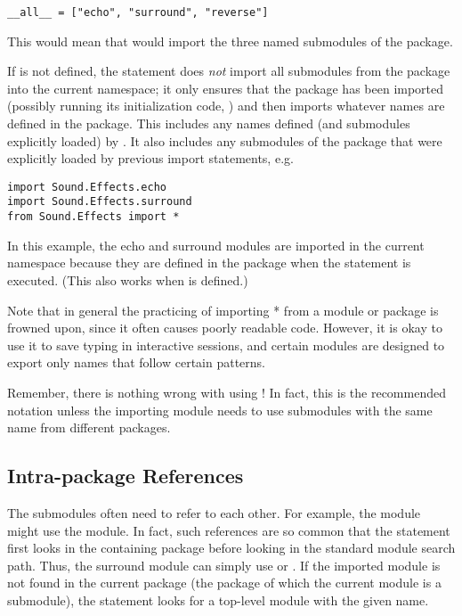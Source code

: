 \documentclass{manual}
\begin{document}
\begin{verbatim}
__all__ = ["echo", "surround", "reverse"]
\end{verbatim}

This would mean that  would
import the three named submodules of the  package.

If  is not defined, the statement  does \emph{not} import all submodules from the package
 into the current namespace; it only ensures that the
package  has been imported (possibly running its
initialization code, ) and then imports whatever names are
defined in the package.  This includes any names defined (and
submodules explicitly loaded) by .  It also includes any
submodules of the package that were explicitly loaded by previous
import statements, e.g.

\begin{verbatim}
import Sound.Effects.echo
import Sound.Effects.surround
from Sound.Effects import *
\end{verbatim}


In this example, the echo and surround modules are imported in the
current namespace because they are defined in the
 package when the  statement
is executed.  (This also works when  is defined.)

Note that in general the practicing of importing * from a module or
package is frowned upon, since it often causes poorly readable code.
However, it is okay to use it to save typing in interactive sessions,
and certain modules are designed to export only names that follow
certain patterns.

Remember, there is nothing wrong with using !  In fact, this is the
recommended notation unless the importing module needs to use
submodules with the same name from different packages.


\subsection{Intra-package References}

The submodules often need to refer to each other.  For example, the
 module might use the  module.  In fact, such references
are so common that the  statement first looks in the
containing package before looking in the standard module search path.
Thus, the surround module can simply use  or
.  If the imported module is not
found in the current package (the package of which the current module
is a submodule), the  statement looks for a top-level module
with the given name.
\end{document}
